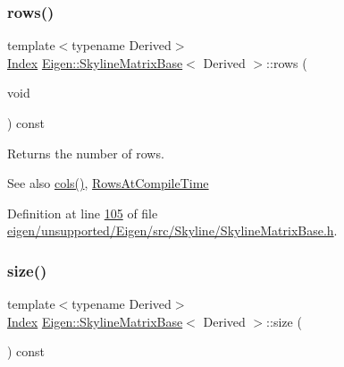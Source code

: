 \mbox{\label{class_eigen_1_1_skyline_matrix_base_a8243b2fe6bcc6c3037717fcb0afa9d46}} 
\subsubsection{\texorpdfstring{rows()}{rows()}\hspace{0.1cm}{\footnotesize\ttfamily [2/2]}}
{\footnotesize\ttfamily template$<$typename Derived$>$ \\
\hyperlink{group___core___module_a554f30542cc2316add4b1ea0a492ff02}{Index} \hyperlink{class_eigen_1_1_skyline_matrix_base}{Eigen\+::\+Skyline\+Matrix\+Base}$<$ Derived $>$\+::rows (\begin{DoxyParamCaption}\item[{void}]{ }\end{DoxyParamCaption}) const\hspace{0.3cm}{\ttfamily [inline]}}

\begin{DoxyReturn}{Returns}
the number of rows. 
\end{DoxyReturn}
\begin{DoxySeeAlso}{See also}
\hyperlink{class_eigen_1_1_skyline_matrix_base_aff9cfadb45ffbae8a33b710bc9b49d71}{cols()}, \hyperlink{class_eigen_1_1_skyline_matrix_base_a811ba3961cb927ae5fa84ed278ebceeaa22b71b821112b0ccf61b7317b9ac4cf4}{Rows\+At\+Compile\+Time} 
\end{DoxySeeAlso}


Definition at line \hyperlink{eigen_2unsupported_2_eigen_2src_2_skyline_2_skyline_matrix_base_8h_source_l00105}{105} of file \hyperlink{eigen_2unsupported_2_eigen_2src_2_skyline_2_skyline_matrix_base_8h_source}{eigen/unsupported/\+Eigen/src/\+Skyline/\+Skyline\+Matrix\+Base.\+h}.

\mbox{\label{class_eigen_1_1_skyline_matrix_base_a635234baea6bd59f97e6bd219adbdb64}} 
\subsubsection{\texorpdfstring{size()}{size()}\hspace{0.1cm}{\footnotesize\ttfamily [1/2]}}
{\footnotesize\ttfamily template$<$typename Derived$>$ \\
\hyperlink{group___core___module_a554f30542cc2316add4b1ea0a492ff02}{Index} \hyperlink{class_eigen_1_1_skyline_matrix_base}{Eigen\+::\+Skyline\+Matrix\+Base}$<$ Derived $>$\+::size (\begin{DoxyParamCaption}{ }\end{DoxyParamCaption}) const\hspace{0.3cm}{\ttfamily [inline]}}

